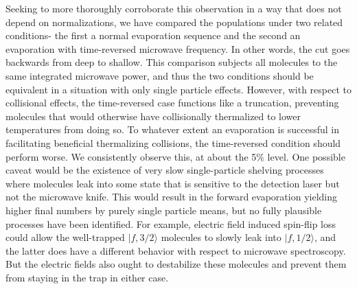 \documentclass[%
 reprint,
 amsmath,amssymb,
 aps,
pra,
]{revtex4-1}
\begin{document}
Seeking to more thoroughly corroborate this observation in a way that does not depend on normalizations, we have compared the populations under two related conditions- the first a normal evaporation sequence and the second an evaporation with time-reversed microwave frequency. 
In other words, the cut goes backwards from deep to shallow. 
This comparison subjects all molecules to the same integrated microwave power, and thus the two conditions should be equivalent in a situation with only single particle effects.
However, with respect to collisional effects, the time-reversed case functions like a truncation, preventing molecules that would otherwise have collisionally thermalized to lower temperatures from doing so.
To whatever extent an evaporation is successful in facilitating beneficial thermalizing collisions, the time-reversed condition should perform worse.
We consistently observe this, at about the 5\% level.
One possible caveat would be the existence of very slow single-particle shelving processes where molecules leak into some state that is sensitive to the detection laser but not the microwave knife.
This would result in the forward evaporation yielding higher final numbers by purely single particle means, but no fully plausible processes have been identified.
For example, electric field induced spin-flip loss could allow the well-trapped $|f,3/2\rangle$ molecules to slowly leak into $|f,1/2\rangle$, and the latter does have a different behavior with respect to microwave spectroscopy. 
But the electric fields also ought to destabilize these molecules and prevent them from staying in the trap in either case.
\end{document}
